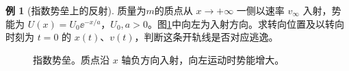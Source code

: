 \documentclass[11pt,openany,fontset=fandol]{ctexbook}
\theoremstyle{definition}\newtheorem{example}{例}[chapter]\newtheorem{exercise}{习题}[chapter]
\begin{document}
\par\medskip\noindent\begin{minipage}{\textwidth}
\begin{example}[指数势垒上的反射]\label{mp4:example:l4-e3}
质量为$m$的质点从 $x\to+\infty$ 一侧以速率 $v_\infty$ 入射，势能为 $U(x)=U_0\ee^{-x/a}$，$U_0,a>0$。图\ref{mp4:fig:l4-e3-q}中向左为入射方向。求转向位置及以转向时刻为 $t=0$ 的 $x(t)$、$v(t)$，判断这条开轨线是否对应逃逸。
\end{example}

\begin{figure}[H]\centering
{}
\caption{指数势垒。质点沿 $x$ 轴负方向入射，向左运动时势能增大。}\label{mp4:fig:l4-e3-q}
\end{figure}
\end{minipage}\par\medskip
\end{document}
